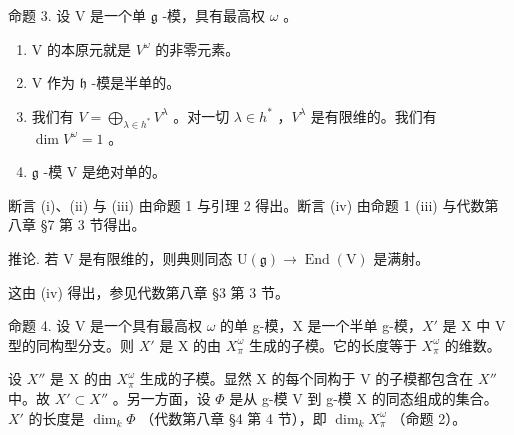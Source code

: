 命题 3. 设 V 是一个单 \(\mathfrak{g}\) -模，具有最高权 \(\omega\) 。

\begin{enumerate}
\def\labelenumi{(\roman{enumi})}
\item
  V 的本原元就是 \(V^{\omega}\) 的非零元素。
\item
  V 作为 \(\mathfrak{h}\) -模是半单的。
\item
  我们有 \(V = \bigoplus_{\lambda \in h^{*}} V^{\lambda}\) 。对一切 \(\lambda \in h^{*}\) ，\(V^{\lambda}\) 是有限维的。我们有 \(\dim V^{\omega} = 1\) 。
\item
  \(\mathfrak{g}\) -模 V 是绝对单的。
\end{enumerate}

断言 (i)、(ii) 与 (iii) 由命题 1 与引理 2 得出。断言 (iv) 由命题 1 (iii) 与代数第八章 §7 第 3 节得出。

推论. 若 \(\mathrm{V}\) 是有限维的，则典则同态 \(\mathrm{U}(\mathfrak{g}) \to \operatorname{End}(\mathrm{V})\) 是满射。

这由 (iv) 得出，参见代数第八章 §3 第 3 节。

命题 4. 设 V 是一个具有最高权 \(\omega\) 的单 g-模，X 是一个半单 g-模，\(X'\) 是 X 中 V 型的同构型分支。则 \(X'\) 是 X 的由 \(X_{\pi}^{\omega}\) 生成的子模。它的长度等于 \(X_{\pi}^{\omega}\) 的维数。

设 \(X''\) 是 X 的由 \(X_{\pi}^{\omega}\) 生成的子模。显然 X 的每个同构于 V 的子模都包含在 \(X''\) 中。故 \(X' \subset X''\) 。另一方面，设 \(\varPhi\) 是从 g-模 V 到 g-模 X 的同态组成的集合。\(X'\) 的长度是 \(\dim_k \varPhi\) （代数第八章 §4 第 4 节），即 \(\dim_k X_{\pi}^{\omega}\) （命题 2）。

